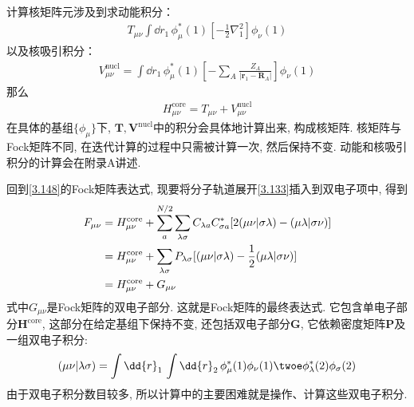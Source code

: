 计算核\ha 矩阵元涉及到求动能积分：
\begin{align}
	T_{\mu\nu}\int\dd{r}_1\,\phi_\mu^*(1)[-\frac{1}{2}\nabla_1^2]\phi_\nu(1)
\end{align}
以及核吸引积分：
\begin{align}
	V_{\mu\nu}^\mathrm{nucl} = \int\dd{r}_1\,\phi_\mu^*(1)\left[ -\sum_{A}\frac{Z_A}{|\mathbf{r}_1-\mathbf{R}_A|} \right]\phi_\nu(1)
\end{align}
那么
\begin{align}
	H_{\mu\nu}^\mathrm{core} = T_{\mu\nu} + V_{\mu\nu}^\mathrm{nucl}
\end{align}
在具体的基组$\{\phi_\mu\}$下, 
$\mathbf{T,V^\mathrm{nucl}}$中的积分会具体地计算出来, 
构成核\ha 矩阵. 
核\ha 矩阵与Fock矩阵不同, 
在迭代计算的过程中只需被计算一次, 
然后保持不变. 
动能和核吸引积分的计算会在附录A讲述.


回到\autoref{3.148}的Fock矩阵表达式, 
现要将分子轨道展开\autoref{3.133}插入到双电子项中, 
得到
\begin{align}
	\label{3.154}
	F_{\mu\nu} & = H_{\mu\nu}^\mathrm{core} + \sum_{a}^{N/2}\sum_{\lambda\sigma}C_{\lambda a}C^*_{\sigma a}[2(\mu\nu|\sigma\lambda)-(\mu\lambda|\sigma\nu )]\notag\\
	& = H_{\mu\nu}^\mathrm{core} + \sum_{\lambda\sigma}P_{\lambda\sigma}[(\mu\nu|\sigma\lambda)-\frac{1}{2}(\mu\lambda|\sigma\nu )]\notag\\
	& = H_{\mu\nu}^\mathrm{core} + G_{\mu\nu}
\end{align}
式中$G_{\mu\nu}$是Fock矩阵的双电子部分. 
这就是Fock矩阵的最终表达式. 
它包含单电子部分$\mathbf{H}^\mathrm{core}$, 
这部分在给定基组下保持不变, 
还包括双电子部分$\mathbf{G}$, 
它依赖密度矩阵$\mathbf{P}$及一组双电子积分:
\begin{align}
	(\mu\nu|\lambda\sigma) = \int\dd{r}_1\,\int\dd{r}_2\,\phi_\mu^*(1)\phi_\nu(1)\twoe\phi_\lambda^*(2)\phi_\sigma(2)
\end{align}
由于双电子积分数目较多, 
所以\hft 计算中的主要困难就是操作、计算这些双电子积分.


